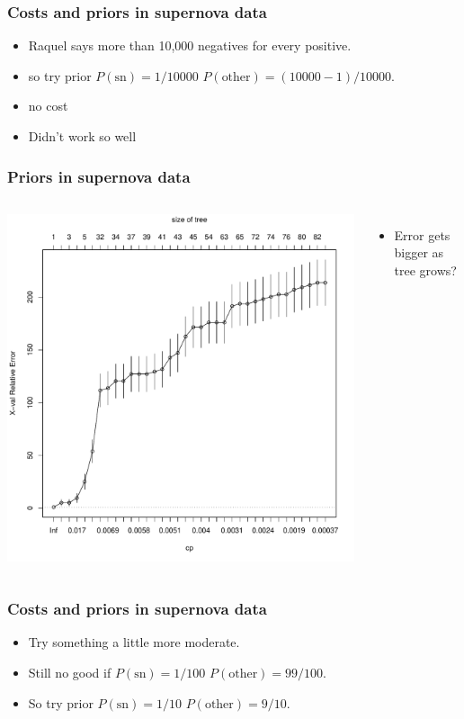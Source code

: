 \documentclass{beamer}
\begin{document}
\begin{frame}
	\frametitle{Costs and priors in supernova data}
	\begin{itemize}
		\item Raquel says more than 10,000 negatives for every positive.
		\item so try prior $P(\text{sn}) = 1/10000$ $P(\text{other}) = (10000-1)/10000$.
		\item no cost
		\item Didn't work so well
	\end{itemize}
\end{frame}

\begin{frame}
	\frametitle{Priors in supernova data}
	\begin{columns}[c] 
			\includegraphics{cpp1.pdf}
			\begin{itemize}
				\item Error gets bigger as tree grows?
			\end{itemize}
	\end{columns}
\end{frame}

\begin{frame}
	\frametitle{Costs and priors in supernova data}
	\begin{itemize}
		\item Try something a little more moderate.
		\item Still no good if $P(\text{sn}) = 1/100$ $P(\text{other}) = 99/100$.
		\item So try prior $P(\text{sn}) = 1/10$ $P(\text{other}) = 9/10$.
	\end{itemize}
\end{frame}
\end{document}
